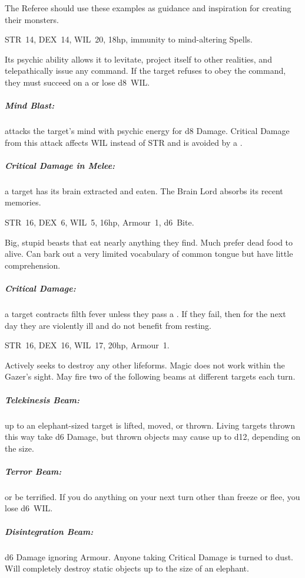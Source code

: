 \documentclass[itdr]{subfiles}
\begin{document}
\label{ch:appendix_b}

The Referee should use these examples as guidance and inspiration for creating their monsters.

\vfill

STR~14, DEX~14, WIL~20, 18hp, immunity to mind-altering Spells.

Its psychic ability allows it to levitate, project itself to other realities, and telepathically issue any command. If the target refuses to obey the command, they must succeed on a  or lose d8~WIL.

\subparagraph{Mind Blast:} attacks the target's mind with psychic energy for d8 Damage. Critical Damage from this attack affects WIL instead of STR and is avoided by a .

\subparagraph{Critical Damage in Melee:} a target has its brain extracted and eaten. The Brain Lord absorbs its recent memories.

\vfill


\vspace{-2ex}

STR~16, DEX~6, WIL~5, 16hp, Armour~1, d6~Bite.

Big, stupid beasts that eat nearly anything they find. Much prefer dead food to alive. Can bark out a very limited vocabulary of common tongue but have little comprehension.

\subparagraph{Critical Damage:} a target contracts filth fever unless they pass a . If they fail, then for the next day they are violently ill and do not benefit from resting.

\vfill

STR~16, DEX~16, WIL~17, 20hp, Armour~1.

Actively seeks to destroy any other lifeforms. Magic does not work within the Gazer's sight. May fire two of the following beams at different targets
each turn.

\subparagraph{Telekinesis Beam:} up to an elephant-sized target is lifted, moved, or thrown. Living targets thrown this way take d6 Damage, but thrown objects may cause up to d12, depending on the size.

\subparagraph{Terror Beam:}  or be terrified. If you do anything on your next turn other than freeze or flee, you lose d6~WIL.

\subparagraph{Disintegration Beam:} d6 Damage ignoring \mbox{Armour}. Anyone taking Critical Damage is turned to dust. Will completely destroy static objects up to the size of an elephant.
\end{document}
